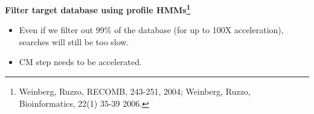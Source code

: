 \documentclass[landscape]{slides}
\begin{document}
\begin{slide}
\begin{center}
\large
\textbf{Filter target database using profile HMMs\footnote{Weinberg,
    Ruzzo, RECOMB, 243-251, 2004; Weinberg, Ruzzo, Bioinformatics,
    22(1) 35-39 2006.}}
\end{center}


\begin{itemize}
\item Even if we filter out 99\% of the database (for up to 100X
  acceleration), searches will still be too slow.
\item CM step needs to be accelerated. 
\end{itemize}

\vfill
\end{slide}
%
%
%
\end{document}
